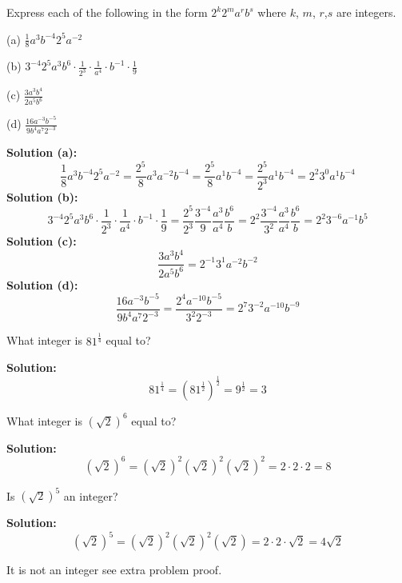 \begin{tcolorbox}[title=Problem 1, breakable]
    Express each of the following in the form 
    $2^k 2^m a^r b^s$ where $k$, $m$, $r$,$s$
    are integers.

    (a) $\frac{1}{8} a^3 b^{-4} 2^5 a^{-2}$

    (b) $3^{-4} 2^5 a^3 b^6 \cdot \frac{1}{2^3} \cdot \frac{1}{a^4} \cdot b^{-1} \cdot \frac{1}{9}$

    (c) $\frac{3a^3b^4}{2a^5b^6}$

    (d) $\frac{16a^{-3}b^{-5}}{9b^4 a^7 2^{-3}}$
\end{tcolorbox}

\textbf{Solution (a):}
\[\frac{1}{8} a^3 b^{-4} 2^5 a^{-2} 
    = \frac{2^5}{8} a^3 a^{-2} b^{-4}
    = \frac{2^5}{8} a^1 b^{-4}
    = \frac{2^5}{2^3} a^1 b^{-4}
    = 2^2 3^0 a^1 b^{-4}\]
\textbf{Solution (b):}
\[3^{-4} 2^5 a^3 b^6 \cdot \frac{1}{2^3} \cdot \frac{1}{a^4} \cdot b^{-1} \cdot \frac{1}{9}
    = \frac{2^5}{2^3} \frac{3^{-4}}{9} \frac{a^3}{a^4} \frac{b^6}{b}
    = 2^2 \frac{3^{-4}}{3^2} \frac{a^3}{a^4} \frac{b^6}{b}
    = 2^2 3^{-6} a^{-1} b^5\]
\textbf{Solution (c):}
\[\frac{3 a^3 b^4}{2 a^5 b^6}
    = 2^{-1} 3^1 a^{-2} b^{-2}\]
\textbf{Solution (d):}
\[\frac{16 a^{-3} b^{-5}}{9 b^4 a^7 2^{-3}}
    = \frac{2^4 a^{-10} b^{-5}}{3^2 2^{-3}}
    = 2^7 3^{-2} a^{-10} b^{-9}\]

\begin{tcolorbox}[title=Problem 2, breakable]
    What integer is $81^{\frac{1}{4}}$ equal to?
\end{tcolorbox}

\textbf{Solution:}
\[81^{\frac{1}{4}} = (81^{\frac{1}{2}})^{\frac{1}{2}} = 9^{\frac{1}{2}} = 3\]

\begin{tcolorbox}[title=Problem 3, breakable]
    What integer is $(\sqrt{2})^6$ equal to?
\end{tcolorbox}

\textbf{Solution:}
\[(\sqrt{2})^6 = (\sqrt{2})^2 (\sqrt{2})^2 (\sqrt{2})^2 = 2 \cdot 2 \cdot 2 = 8\]

\begin{tcolorbox}[title=Problem 4, breakable]
    Is $(\sqrt{2})^5$ an integer?
\end{tcolorbox}

\textbf{Solution:}
\[(\sqrt{2})^5 = (\sqrt{2})^2 (\sqrt{2})^2 (\sqrt{2}) = 2 \cdot 2 \cdot \sqrt{2} = 4 \sqrt{2}\]

It is not an integer see extra problem proof.

